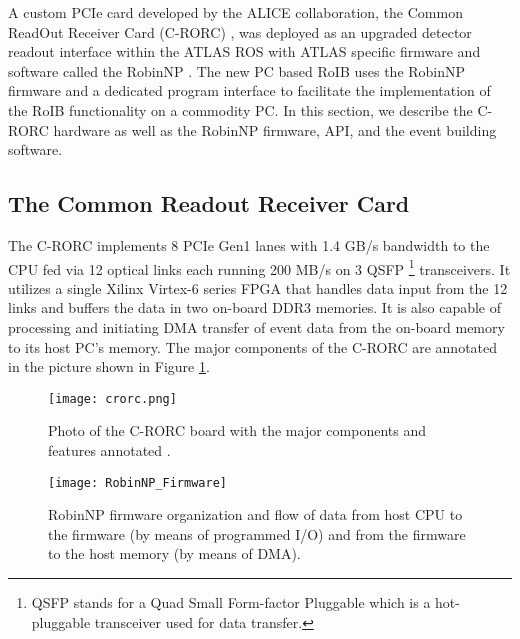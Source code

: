  A custom PCIe card developed by the ALICE collaboration, the Common ReadOut Receiver Card (C-RORC) \cite{alice}, was deployed as an 
upgraded detector readout interface within the ATLAS ROS with ATLAS specific firmware and software called the RobinNP \cite{crorc}. 
The new PC based RoIB uses the RobinNP firmware and a dedicated program 
interface to facilitate the implementation of the RoIB functionality 
on a commodity PC. In this section, we describe the C-RORC hardware as well as the RobinNP firmware, API, and the event building software. 
\subsection{The Common Readout Receiver Card}\label{sec:crorc}

The C-RORC implements 8 PCIe Gen1 lanes with 1.4 GB/s bandwidth to the CPU fed via 12 optical links each running 200 MB/s on 3 QSFP 
\footnote{QSFP stands for a Quad Small Form-factor Pluggable which is 
a hot-pluggable transceiver used for data transfer.}
transceivers. It utilizes a single Xilinx Virtex-6 series FPGA that handles data input from the 12 links and buffers the data in two on-board DDR3 memories. It is also capable of processing and initiating DMA transfer of event data from the on-board memory to its host PC's memory. The major components of the C-RORC are annotated 
in the picture shown in Figure \ref{fig:crorc}.


\begin{figure}[tbp] %
\centering
\texttt{[image: crorc.png]}
\caption{Photo of the C-RORC board with the major components and features annotated \cite{crorc}.}
\label{fig:crorc}
\end{figure}

\begin{figure}[tbp] %
\centering
\texttt{[image: RobinNP\_Firmware]}

\caption{RobinNP firmware organization
and  flow  of  data  from  host  CPU  to  the
firmware  (by  means  of  programmed  I/O)
and from the firmware to the host memory
(by means of DMA).}
\label{fig:robinnp_fw}
\end{figure}

